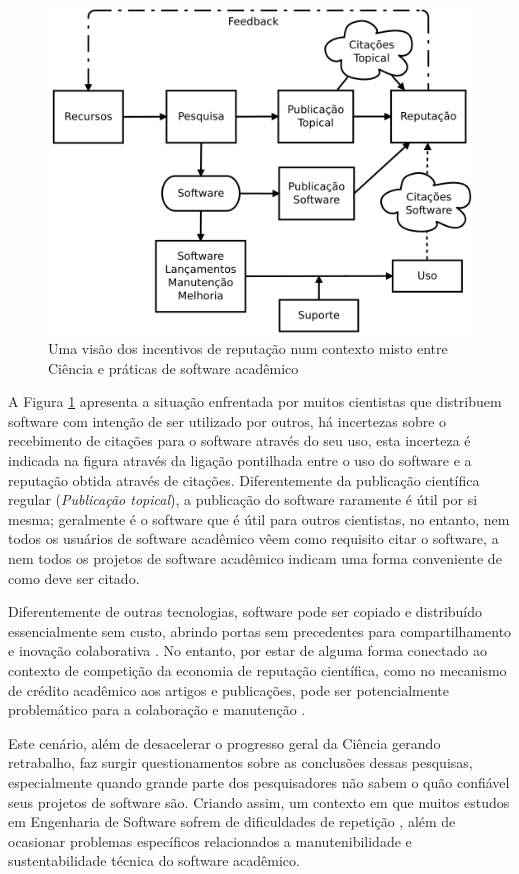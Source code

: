 \begin{figure}[h]
  \center
  \includegraphics[scale=0.35]{imagens/scientific-reputation-diagram.png}
  \caption{Uma visão dos incentivos de reputação num contexto misto entre Ciência e práticas de software acadêmico \cite{howison2011scientific}}
  \label{scientific-reputation-diagram}
\end{figure}

A Figura \ref{scientific-reputation-diagram} apresenta a situação enfrentada
por muitos cientistas que distribuem software com intenção de ser utilizado por
outros, há incertezas sobre o recebimento de citações para o software
através do seu uso, esta incerteza é indicada na figura através da ligação pontilhada entre o uso do
software e a reputação obtida através de citações. Diferentemente da
publicação científica regular ({\it Publicação topical}), a publicação do software
raramente é útil por si mesma; geralmente é o software que é útil para outros
cientistas, no entanto, nem todos os usuários de software acadêmico vêem como
requisito citar o software, a nem todos os projetos de software acadêmico
indicam uma forma conveniente de como deve ser citado.

Diferentemente de outras tecnologias, software pode ser copiado e distribuído
essencialmente sem custo, abrindo portas sem precedentes para
compartilhamento e inovação colaborativa \cite{howison2011scientific}. No
entanto, por estar de alguma forma conectado ao contexto de competição da economia de
reputação científica, como no mecanismo de crédito acadêmico aos artigos e publicações,
pode ser potencialmente problemático para a colaboração e manutenção
\cite{howison2011scientific}.

Este cenário, além de desacelerar o progresso geral da Ciência gerando
retrabalho, faz surgir questionamentos sobre as conclusões dessas pesquisas,
especialmente quando grande parte dos pesquisadores não sabem o quão confiável
seus projetos de software são. Criando assim, um contexto em que muitos estudos
em Engenharia de Software sofrem de dificuldades de repetição
\cite{tang2016worthiness}, além de ocasionar problemas específicos relacionados a
manutenibilidade e sustentabilidade técnica do software acadêmico.
